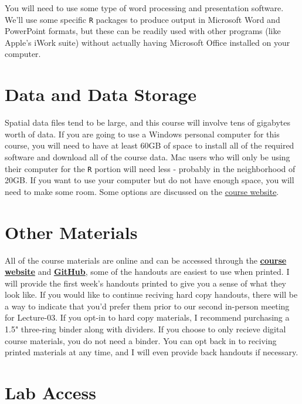\documentclass[]{book}
\begin{document}
You will need to use some type of word processing and presentation software. We'll use some specific \texttt{R} packages to produce output in Microsoft Word and PowerPoint formats, but these can be readily used with other programs (like Apple's iWork suite) without actually having Microsoft Office installed on your computer.

\hypertarget{data-and-data-storage}{%
\section{Data and Data Storage}\label{data-and-data-storage}}

Spatial data files tend to be large, and this course will involve tens of gigabytes worth of data. If you are going to use a Windows personal computer for this course, you will need to have at least 60GB of space to install all of the required software and download all of the course data. Mac users who will only be using their computer for the \texttt{R} portion will need less - probably in the neighborhood of 20GB. If you want to use your computer but do not have enough space, you will need to make some room. Some options are discussed on the \href{https://slu-soc5650.github.io/docs/course-software/}{course website}.

\hypertarget{other-materials}{%
\section{Other Materials}\label{other-materials}}

All of the course materials are online and can be accessed through the \href{https://slu-soc5650.github.io}{\textbf{course website}} and \href{http://www.github.com}{\textbf{GitHub}}, some of the handouts are easiest to use when printed. I will provide the first week's handouts printed to give you a sense of what they look like. If you would like to continue reciving hard copy handouts, there will be a way to indicate that you'd prefer them prior to our second in-person meeting for Lecture-03. If you opt-in to hard copy materials, I recommend purchasing a 1.5" three-ring binder along with dividers. If you choose to only recieve digital course materials, you do not need a binder. You can opt back in to reciving printed materials at any time, and I will even provide back handouts if necessary.

\hypertarget{lab-access}{%
\section{Lab Access}\label{lab-access}}
\end{document}
